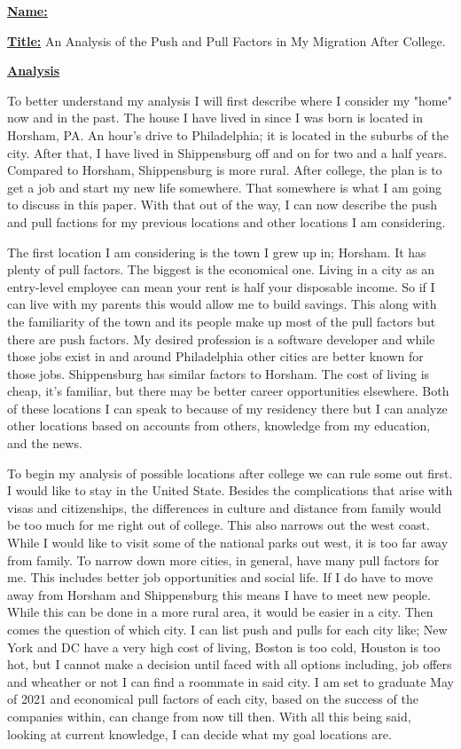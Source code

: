 \documentclass{article}
\author{Ryan Bruno}
\date{\today}
\renewcommand{\maketitle}{
\textbf{\underline{Name:}}
\theauthor

\textbf{\underline{Title:}}
An Analysis of the Push and Pull Factors in My Migration After College.
}
\begin{document}
\maketitle

\textbf{\underline{Analysis}}

\setlength{\parindent}{10ex}
To better understand my analysis I will first describe where I consider my "home" now and in the past. The house I have lived in since I was born is located in Horsham, PA. An hour's drive to Philadelphia; it is located in the suburbs of the city. After that, I have lived in Shippensburg off and on for two and a half years. Compared to Horsham, Shippensburg is more rural. After college, the plan is to get a job and start my new life somewhere. That somewhere is what I am going to discuss in this paper. With that out of the way, I can now describe the push and pull factions for my previous locations and other locations I am considering.

The first location I am considering is the town I grew up in; Horsham. It has plenty of pull factors. The biggest is the economical one. Living in a city as an entry-level employee can mean your rent is half your disposable income. So if I can live with my parents this would allow me to build savings. This along with the familiarity of the town and its people make up most of the pull factors but there are push factors. My desired profession is a software developer and while those jobs exist in and around Philadelphia other cities are better known for those jobs. Shippensburg has similar factors to Horsham. The cost of living is cheap, it's familiar, but there may be better career opportunities elsewhere. Both of these locations I can speak to because of my residency there but I can analyze other locations based on accounts from others, knowledge from my education, and the news.

To begin my analysis of possible locations after college we can rule some out first. I would like to stay in the United State. Besides the complications that arise with visas and citizenships, the differences in culture and distance from family would be too much for me right out of college. This also narrows out the west coast. While I would like to visit some of the national parks out west, it is too far away from family. To narrow down more cities, in general, have many pull factors for me. This includes better job opportunities and social life. If I do have to move away from Horsham and Shippensburg this means I have to meet new people. While this can be done in a more rural area, it would be easier in a city. Then comes the question of which city. I can list push and pulls for each city like; New York and DC have a very high cost of living, Boston is too cold, Houston is too hot, but I cannot make a decision until faced with all options including, job offers and wheather or not I can find a roommate in said city. I am set to graduate May of 2021 and economical pull factors of each city, based on the success of the companies within, can change from now till then. With all this being said, looking at current knowledge, I can decide what my goal locations are.
\end{document}
